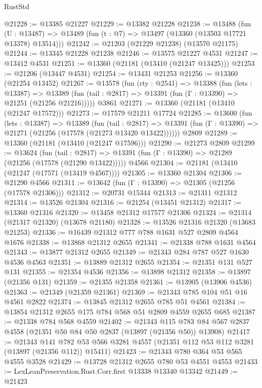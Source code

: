 \begin{lexlean}{RustStd}
\begin{coremodule}
@21228 := @13385 @21227
@21229 := @13382 @21228
@21238 := @13488
    (fun (U : @13487) => @13489 (fun (t : @7) => @13497 (@13360 (@13503 @17721 @13378) @13514)))
@21242 := @21203 (@21229 @21238) (@13570 @21175)
@21244 := @13345 @21228 @21238
@21246 := @13575 @21227 @4531
@21247 := @13412 @4531
@21251 := @13360 (@21181 (@13410 (@21247 @13425)))
@21253 := @21206 (@13447 @4531)
@21254 := @13431 @21253
@21256 := @13360 (@21254 @13452)
@21267 := @13578
    (fun (rty : @2541) =>
    @13388
      (fun (lets : @13387) =>
      @13389 (fun (tail : @2817) => @13391 (fun (Γ : @13390) => @21251 (@21256 @21216)))))
    @3861
@21271 := @13360 (@21181 (@13410 (@21247 @17572)))
@21273 := @17579 @21211 @17724
@21285 := @13600
    (fun (lets : @13387) =>
    @13389
      (fun (tail : @2817) =>
      @13391 (fun (Γ : @13390) => @21271 (@21256 (@17578 (@21273 @13420 @13422))))))
    @2809
@21289 := @13360 (@21181 (@13410 (@21247 @17596)))
@21290 := @21273 @2809
@21299 := @13624
    (fun (tail : @2817) => @13391 (fun (Γ : @13390) => @21289 (@21256 (@17578 (@21290 @13422)))))
    @4566
@21304 := @21181 (@13410 (@21247 (@17571 (@13419 @4567))))
@21305 := @13360 @21304
@21306 := @21290 @4566
@21311 := @13642 (fun (Γ : @13390) => @21305 (@21256 (@17578 @21306)))
@21312 := @20731 @15344
@21313 := @21311 @21312
@21314 := @13526 @21304
@21316 := @21254 (@13451 @21312)
@21317 := @13360 @21316
@21320 := @13458 @21312 @17577 @21306
@21324 := @21314 (@21317 @21320) (@13678 @21180)
@21328 := @13526 @21316 @21320 (@13683 @21253)
@21336 := @16439 @21312 @777 @788 @1631 @527 @2809 @4564 @1676
@21338 := @13868 @21312 @2655
@21341 := @21338 @788 @1631 @4564
@21343 := @13877 @21312 @2655
@21349 := @21343 @284 @787 @527 @1630 @4536 @4563
@21351 := @13889 @21312 @2655
@21354 := @21351 @131 @527 @131
@21355 := @21354 @4536
@21356 := @13898 @21312
@21358 := @13897 (@21356 @131)
@21359 := @21355 @21358
@21361 := @13905 (@13906 @4536)
@21363 := @21349 (@21359 @21361)
@21369 := @21343 @785 @104 @51 @16 @4561 @2822
@21374 := @13845 @21312 @2655 @785 @51 @4561
@21384 := @13854 @21312 @2655 @175 @784 @568 @51 @2809 @4559 @2655 @685
@21387 := @21338 @784 @568 @4559
@21402 := @21343
    @115
    @783
    @84
    @567
    @2837
    @4558
    (@21351 @50 @84 @50 @2837 (@13897 (@21356 @50)) @13908)
@21417 := @21343
    @141
    @782
    @53
    @566
    @3281
    @4557
    (@21351 @112 @53 @112 @3281 (@13897 (@21356 @112)) @15411)
@21423 := @21343 @780 @364 @53 @565 @4555 @3528
@21429 := @13728 @21312 @2655 @780 @53 @4551 @4553
@21433 := LexLeanPreservation.Rust.Corr.first @13338 @13340 @13342
@21449 := @21423

\end{coremodule}
\end{lexlean}
